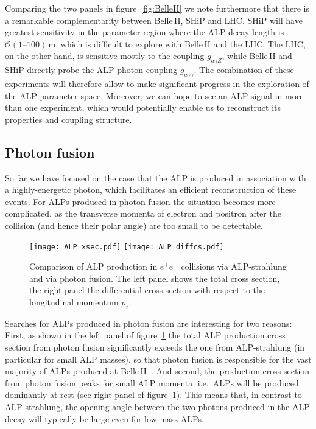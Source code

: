 \documentclass[11pt,a4paper]{article}
\newcommand{\ga}{g_{a\gamma\gamma}}
\def \belletwo {Belle\,II\xspace}
\begin{document}
Comparing the two panels in figure~\ref{fig:BelleII} we note furthermore that there is a remarkable complementarity between \belletwo, SHiP and LHC. SHiP will have greatest sensitivity in the parameter region where the ALP decay length is $\mathcal{O}(1\text{--}100)\,\mathrm{m}$, which is difficult to explore with \belletwo and the LHC. The LHC, on the other hand, is sensitive mostly to the coupling $g_{a\gamma Z}$, while \belletwo and SHiP directly probe the ALP-photon coupling $\ga$. The combination of these experiments will therefore allow to make significant progress in the exploration of the ALP parameter space. Moreover, we can hope to see an ALP signal in more than one experiment, which would potentially enable us to reconstruct its properties and coupling structure.

\subsection{Photon fusion}
\label{sec:photonfusion}

So far we have focused on the case that the ALP is produced in association with a highly-energetic photon, which facilitates an efficient reconstruction of these events. For ALPs produced in photon fusion the situation becomes more complicated, as the transverse momenta of electron and positron after the collision (and hence their polar angle) are too small to be detectable.

\begin{figure}
\centering
\texttt{[image: ALP\_xsec.pdf]}\qquad
\texttt{[image: ALP\_diffcs.pdf]}
\caption{\label{fig:fusion} Comparison of ALP production in $e^+ e^-$ collisions via ALP-strahlung and via photon fusion. The left panel shows the total cross section, the right panel the differential cross section with respect to the longitudinal momentum $p_z$.}
\end{figure}

Searches for ALPs produced in photon fusion are interesting for two reasons: First, as shown in the left panel of figure~\ref{fig:fusion} the total ALP production cross section from photon fusion significantly exceeds the one from ALP-strahlung (in particular for small ALP masses), so that photon fusion is responsible for the vast majority of ALPs produced at \belletwo~\cite{Marciano:2016yhf,Izaguirre:2016dfi}. And second, the production cross section from photon fusion peaks for small ALP momenta, i.e.\ ALPs will be produced dominantly at rest (see right panel of figure~\ref{fig:fusion}). This means that, in contrast to ALP-strahlung, the opening angle between the two photons produced in the ALP decay will typically be large even for low-mass ALPs. 
\end{document}
